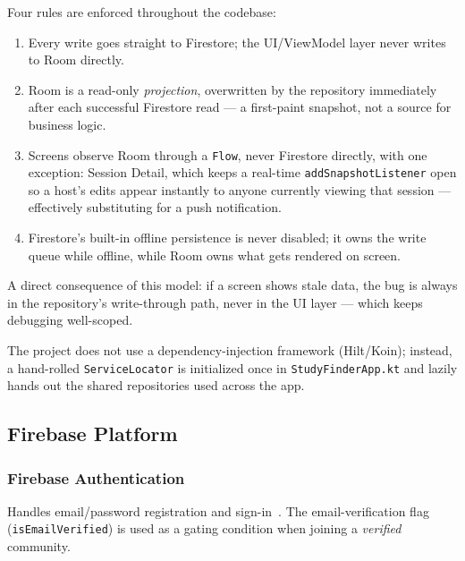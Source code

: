 Four rules are enforced throughout the codebase:
\begin{enumerate}
    \item Every write goes straight to Firestore; the UI/ViewModel layer never writes to Room directly.
    \item Room is a read-only \emph{projection}, overwritten by the repository immediately after each successful Firestore read — a first-paint snapshot, not a source for business logic.
    \item Screens observe Room through a \texttt{Flow}, never Firestore directly, with one exception: Session Detail, which keeps a real-time \texttt{addSnapshotListener} open so a host's edits appear instantly to anyone currently viewing that session — effectively substituting for a push notification.
    \item Firestore's built-in offline persistence is never disabled; it owns the write queue while offline, while Room owns what gets rendered on screen.
\end{enumerate}

A direct consequence of this model: if a screen shows stale data, the bug is always in the repository's write-through path, never in the UI layer — which keeps debugging well-scoped.

The project does not use a dependency-injection framework (Hilt/Koin); instead, a hand-rolled \texttt{ServiceLocator} is initialized once in \texttt{StudyFinderApp.kt} and lazily hands out the shared repositories used across the app.

\subsection{Firebase Platform}

\subsubsection{Firebase Authentication}
Handles email/password registration and sign-in~\cite{firebase-auth}. The email-verification flag (\texttt{isEmailVerified}) is used as a gating condition when joining a \emph{verified} community.

